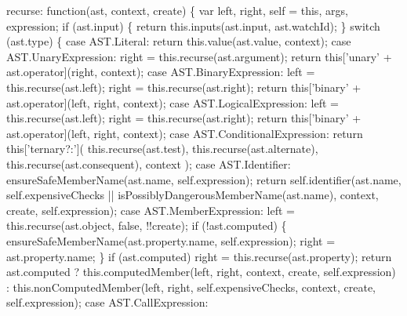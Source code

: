 \begin{DoxyCodeInclude}
{{{  recurse: \textcolor{keyword}{function}(ast, context, create) \{
    var left, right, \textcolor{keyword}{self} = \textcolor{keyword}{this}, args, expression;
    \textcolor{keywordflow}{if} (ast.input) \{
      \textcolor{keywordflow}{return} this.inputs(ast.input, ast.watchId);
    \}
    \textcolor{keywordflow}{switch} (ast.type) \{
    \textcolor{keywordflow}{case} AST.Literal:
      \textcolor{keywordflow}{return} this.value(ast.value, context);
    \textcolor{keywordflow}{case} AST.UnaryExpression:
      right = this.recurse(ast.argument);
      \textcolor{keywordflow}{return} \textcolor{keyword}{this}[\textcolor{stringliteral}{'unary'} + ast.operator](right, context);
    \textcolor{keywordflow}{case} AST.BinaryExpression:
      left = this.recurse(ast.left);
      right = this.recurse(ast.right);
      \textcolor{keywordflow}{return} \textcolor{keyword}{this}[\textcolor{stringliteral}{'binary'} + ast.operator](left, right, context);
    \textcolor{keywordflow}{case} AST.LogicalExpression:
      left = this.recurse(ast.left);
      right = this.recurse(ast.right);
      \textcolor{keywordflow}{return} \textcolor{keyword}{this}[\textcolor{stringliteral}{'binary'} + ast.operator](left, right, context);
    \textcolor{keywordflow}{case} AST.ConditionalExpression:
      \textcolor{keywordflow}{return} \textcolor{keyword}{this}[\textcolor{stringliteral}{'ternary?:'}](
        this.recurse(ast.test),
        this.recurse(ast.alternate),
        this.recurse(ast.consequent),
        context
      );
    \textcolor{keywordflow}{case} AST.Identifier:
      ensureSafeMemberName(ast.name, \textcolor{keyword}{self}.expression);
      \textcolor{keywordflow}{return} \textcolor{keyword}{self}.identifier(ast.name,
                             \textcolor{keyword}{self}.expensiveChecks || isPossiblyDangerousMemberName(ast.name),
                             context, create, \textcolor{keyword}{self}.expression);
    \textcolor{keywordflow}{case} AST.MemberExpression:
      left = this.recurse(ast.object, \textcolor{keyword}{false}, !!create);
      \textcolor{keywordflow}{if} (!ast.computed) \{
        ensureSafeMemberName(ast.property.name, \textcolor{keyword}{self}.expression);
        right = ast.property.name;
      \}
      \textcolor{keywordflow}{if} (ast.computed) right = this.recurse(ast.property);
      \textcolor{keywordflow}{return} ast.computed ?
        this.computedMember(left, right, context, create, \textcolor{keyword}{self}.expression) :
        this.nonComputedMember(left, right, self.expensiveChecks, context, create, self.expression);
    \textcolor{keywordflow}{case} AST.CallExpression:
}}}
\end{DoxyCodeInclude}
